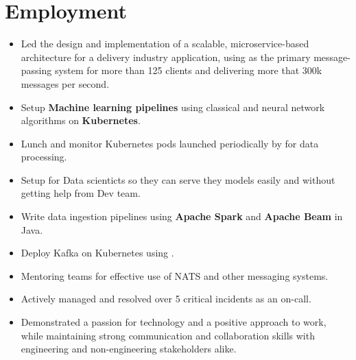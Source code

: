 \section{Employment}

\vspace{0.5cm}

\begin{itemize}
  \item Led the design and implementation of a scalable, microservice-based architecture for a delivery industry application,
    using  as the primary message-passing system for more than 125 clients and delivering
    more that 300k messages per second.
  \item Setup \textbf{Machine learning pipelines} using classical and neural network algorithms on \textbf{Kubernetes}.
  \item Lunch and monitor Kubernetes pods launched periodically by  for data processing.
  \item Setup  for Data scienticts so they can serve they models easily and without getting help from Dev team.
  \item Write data ingestion pipelines using \textbf{Apache Spark} and \textbf{Apache Beam} in Java.
  \item Deploy Kafka on Kubernetes using .
  \item Mentoring teams for effective use of NATS and other messaging systems.
  \item Actively managed and resolved over 5 critical incidents as an on-call.
  \item Demonstrated a passion for technology and a positive approach to work,
    while maintaining strong communication and collaboration skills with engineering
    and non-engineering stakeholders alike.
\end{itemize}

